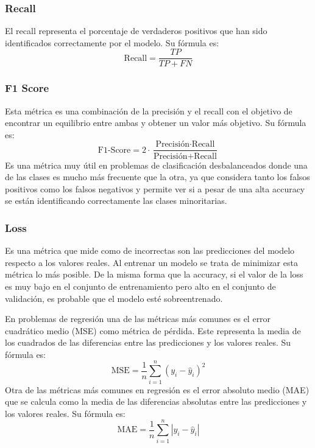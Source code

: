 \subsubsection{Recall}

El recall representa el porcentaje de verdaderos positivos que han sido identificados correctamente por el modelo.
Su fórmula es:
\begin{equation}
	\text{Recall} = \frac{TP}{TP + FN}
\end{equation}

\subsubsection{F1 Score}

Esta métrica es una combinación de la precisión y el recall con el objetivo de encontrar un equilibrio entre ambas y obtener un valor más objetivo.
Su fórmula es:
\begin{equation}
	\text{F1-Score} = 2 \cdot \frac{\text{Precisión} \cdot \text{Recall}}{\text{Precisión} + \text{Recall}}
\end{equation}
Es una métrica muy útil en problemas de clasificación desbalanceados donde una de las clases es mucho más frecuente que la otra, ya que considera tanto los falsos positivos como los falsos negativos y permite ver si a pesar de una alta accuracy se están identificando correctamente las clases minoritarias.

\subsubsection{Loss}

Es una métrica que mide como de incorrectas son las predicciones del modelo respecto a los valores reales. \cite{google:linear-regression}
Al entrenar un modelo se trata de minimizar esta métrica lo más posible. 
De la misma forma que la accuracy, si el valor de la loss es muy bajo en el conjunto de entrenamiento pero alto en el conjunto de validación, es probable que el modelo esté sobreentrenado.

En problemas de regresión una de las métricas más comunes es el error cuadrático medio (MSE) como métrica de pérdida. Este representa la media de los cuadrados de las diferencias entre las predicciones y los valores reales. Su fórmula es: \begin{equation}
	\text{MSE} = \frac{1}{n} \sum_{i=1}^{n} (y_i - \hat{y}_i)^2
\end{equation}
Otra de las métricas más comunes en regresión es el error absoluto medio (MAE) que se calcula como la media de las diferencias absolutas entre las predicciones y los valores reales. Su fórmula es: \begin{equation}
	\text{MAE} = \frac{1}{n} \sum_{i=1}^{n} |y_i - \hat{y}_i|
\end{equation}

